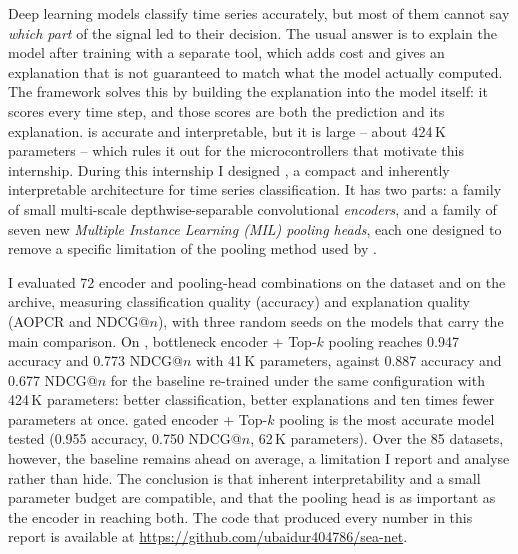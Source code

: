 
Deep learning models classify time series accurately, but most of them cannot say
\emph{which part} of the signal led to their decision. The usual answer is to explain the model
after training with a separate tool, which adds cost and gives an explanation that is not
guaranteed to match what the model actually computed. The \millet{} framework solves this by
building the explanation into the model itself: it scores every time step, and those scores are
both the prediction and its explanation. \millet{} is accurate and interpretable, but it is
large -- about 424\,K parameters -- which rules it out for the microcontrollers that motivate this
internship. During this internship I designed \seanet{}, a compact and inherently interpretable
architecture for time series classification. It has two parts: a family of small multi-scale
depthwise-separable convolutional \emph{encoders}, and a family of seven new \emph{Multiple
Instance Learning (MIL) pooling heads}, each one designed to remove a specific limitation of the
pooling method used by \millet{}.

I evaluated 72 encoder and pooling-head combinations on the \webtraffic{} dataset and on the
\ucr{} archive, measuring classification quality (accuracy) and explanation quality (AOPCR and
NDCG@$n$), with three random seeds on the models that carry the main comparison. On
\webtraffic{}, \seanet{} bottleneck encoder + Top-$k$ pooling reaches 0.947 accuracy and 0.773
NDCG@$n$ with 41\,K parameters, against 0.887 accuracy and 0.677 NDCG@$n$ for the \millet{}
baseline re-trained under the same configuration with 424\,K parameters: better classification,
better explanations and ten times fewer parameters at once. \seanet{} gated encoder + Top-$k$
pooling is the most accurate model tested (0.955 accuracy, 0.750 NDCG@$n$, 62\,K parameters). Over
the 85 \ucr{} datasets, however, the \millet{} baseline remains ahead on average, a limitation I
report and analyse rather than hide. The conclusion is that inherent interpretability and a small
parameter budget are compatible, and that the pooling head is as important as the encoder in
reaching both. The code that produced every number in this report is available at
\url{https://github.com/ubaidur404786/sea-net}.
